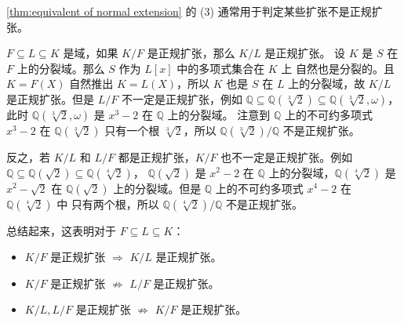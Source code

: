 \autoref{thm:equivalent of normal extension} 的 (3) 通常用于判定某些扩张不是正规扩张。

\begin{example}
  $F\subseteq L\subseteq K$ 是域，如果 $K/F$ 是正规扩张，那么 $K/L$ 是正规扩张。
  设 $K$ 是 $S$ 在 $F$ 上的分裂域。那么 $S$ 作为 $L[x]$ 中的多项式集合在 $K$ 上
  自然也是分裂的。且 $K=F(X)$ 自然推出 $K=L(X)$，所以 $K$ 也是 $S$
  在 $L$ 上的分裂域，故 $K/L$ 是正规扩张。但是 $L/F$ 不一定是正规扩张，例如
  $\mathbb{Q}\subseteq \mathbb{Q}(\sqrt[3]{2})\subseteq\mathbb{Q}(\sqrt[3]{2},\omega)$，
  此时 $\mathbb{Q}(\sqrt[3]{2},\omega)$ 是 $x^3-2$ 在 $\mathbb{Q}$ 上的分裂域。
  注意到 $\mathbb{Q}$ 上的不可约多项式 $x^3-2$ 在 $\mathbb{Q}(\sqrt[3]{2})$ 只有一个根
  $\sqrt[3]{2}$，所以 $\mathbb{Q}(\sqrt[3]{2})/\mathbb{Q}$ 不是正规扩张。

  反之，若 $K/L$ 和 $L/F$ 都是正规扩张，$K/F$ 也不一定是正规扩张。例如
  $\mathbb{Q}\subseteq\mathbb{Q}(\sqrt{2})\subseteq\mathbb{Q}(\sqrt[4]{2})$，
  $\mathbb{Q}(\sqrt{2})$ 是 $x^2-2$ 在 $\mathbb{Q}$ 上的分裂域，$\mathbb{Q}(\sqrt[4]{2})$
  是 $x^2-\sqrt{2}$ 在 $\mathbb{Q}(\sqrt{2})$ 上的分裂域。但是
  $\mathbb{Q}$ 上的不可约多项式 $x^4-2$ 在 $\mathbb{Q}(\sqrt[4]{2})$ 中
  只有两个根，所以 $\mathbb{Q}(\sqrt[4]{2})/\mathbb{Q}$ 不是正规扩张。

  总结起来，这表明对于 $F\subseteq L\subseteq K$：
  \begin{itemize}
    \item $K/F$ 是正规扩张 $\Rightarrow$ $K/L$ 是正规扩张。
    \item $K/F$ 是正规扩张 $\not\Rightarrow$ $L/F$ 是正规扩张。
    \item $K/L,L/F$ 是正规扩张 $\not\Rightarrow$ $K/F$ 是正规扩张。
  \end{itemize}
\end{example}
